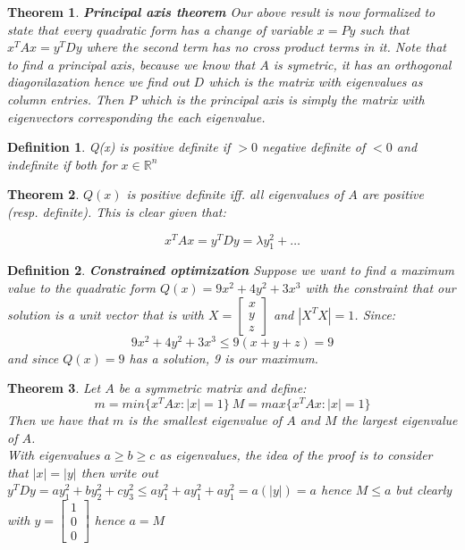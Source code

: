 \documentclass[titlepage]{article}
\newtheorem{thm}{Theorem}[subsection]
\newtheorem{definition}{Definition}[subsection]
\numberwithin{equation}{subsection}
\newcommand{\Rn}{\mathbb{R}^n}
\begin{document}
\begin{thm}\textbf{Principal axis theorem}
Our above result is now formalized to state that every quadratic form has a change of variable $x = Py$ such that $x^{T}Ax = y^{T}Dy$ where the second term has no cross product terms in it. Note that to find a principal axis, because we know that $A$ is symetric, it has an orthogonal diagonilazation hence we find out $D$ which is the matrix with eigenvalues as column entries. Then $P$ which is the principal axis is simply the matrix with eigenvectors corresponding the each eigenvalue. 
\end{thm}


\begin{definition}
Q(x) is positive definite if $>0$ negative definite of $<0$ and indefinite if both for $x \in \Rn$
\end{definition}

\begin{thm}
$Q(x)$ is positive definite iff. all eigenvalues of $A$ are positive (resp. definite). This is clear given that:

$$x^{T}Ax = y^{T}Dy = \lambda y_{1}^{2} + \ldots $$
\end{thm}


\begin{definition}\textbf{Constrained optimization}
Suppose we want to find a maximum value to the quadratic form $Q(x) = 9x^2 + 4y^2 + 3x^3$ with the constraint that our solution is a unit vector that is with $X = \begin{bmatrix}
    x \\
    y \\
    z
\end{bmatrix}$ and $|X^{T}X| = 1$. Since:
$$  9x^2 + 4y^2 + 3x^3 \leq 9(x + y + z) = 9$$ and since $Q(x) = 9$ has a solution, 9 is our maximum. 
\end{definition}


\begin{thm}
\label{eigenvalthm}
Let $A$ be a symmetric matrix and define:
$$ m = min\{x^{T}Ax: |x| = 1\} \ M = max\{x^{T}Ax: |x| = 1\}$$
Then we have that $m$ is the smallest eigenvalue of $A$ and $M$ the largest eigenvalue of $A$. 
\\

With eigenvalues $a \geq b \geq c$ as eigenvalues, the idea of the proof is to consider that $|x| = |y|$ then write out $y^{T}Dy = ay_{1}^{2} + by_{2}^{2} + cy_{3}^{2} \leq  ay_{1}^{2} + ay_{1}^{2} + ay_{1}^{2} = a(|y|) = a$ hence $M \leq a$ but clearly with $y = \begin{bmatrix}
    1\\
    0\\
    0
\end{bmatrix}$ hence $a = M$
\end{thm}
\end{document}
